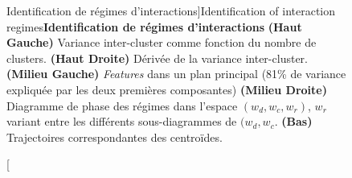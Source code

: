 \begin{figure}
\caption[Identification of interaction regimes][Identification de régimes d'interactions]{Identification of interaction regimes\label{fig:causalityregimes:clustering}}{\textbf{Identification de régimes d'interactions} \textbf{(Haut Gauche)} Variance inter-cluster comme fonction du nombre de clusters. \textbf{(Haut Droite)} Dérivée de la variance inter-cluster. \textbf{(Milieu Gauche)} \emph{Features} dans un plan principal (81\% de variance expliquée par les deux premières composantes) \textbf{(Milieu Droite)} Diagramme de phase des régimes dans l'espace $(w_{d},w_{c},w_{r})$, $w_r$ variant entre les différents sous-diagrammes de $(w_{d},w_{c}$. \textbf{(Bas)} Trajectoires correspondantes des centroïdes.\label{fig:causalityregimes:clustering}}
\end{figure}




